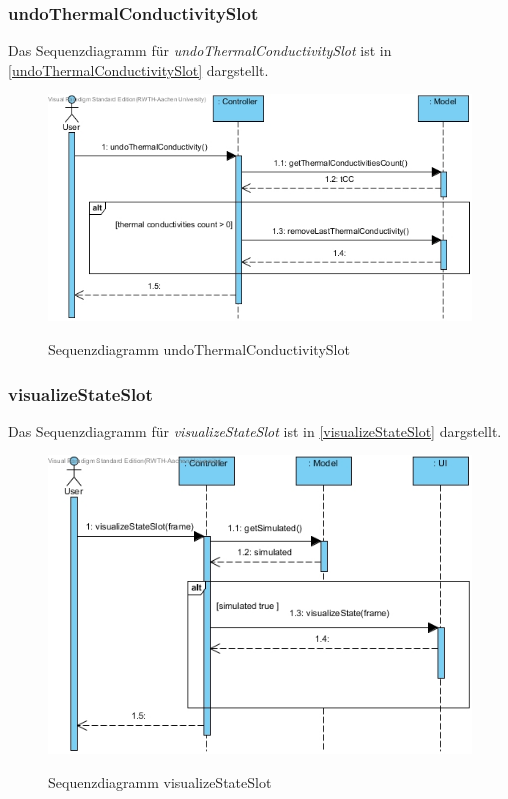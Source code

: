 \subsubsection*{undoThermalConductivitySlot}

Das Sequenzdiagramm für \emph{undoThermalConductivitySlot} ist in \ref{undoThermalConductivitySlot} dargstellt.

\begin{figure}[H]
	\centering
	\includegraphics[scale=.6]{Bilder/Controller__undoThermalConductivitySlot().jpg}\\
	\caption{Sequenzdiagramm undoThermalConductivitySlot}
	\label{Sequenzdiagramm undoThermalConductivitySlot}
\end{figure}

\subsubsection*{visualizeStateSlot}

Das Sequenzdiagramm für \emph{visualizeStateSlot} ist in \ref{visualizeStateSlot} dargstellt.

\begin{figure}[H]
	\centering
	\includegraphics[scale=.6]{Bilder/Controller__visualizeStateSlot().jpg}\\
	\caption{Sequenzdiagramm visualizeStateSlot}
	\label{Sequenzdiagramm visualizeStateSlot}
\end{figure}
